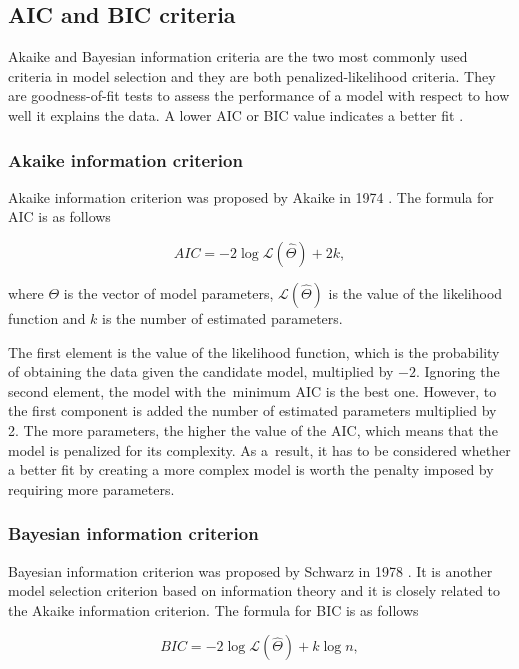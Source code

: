 \documentclass[english]{pwr_wmat_praca_dyplomowa}
\theoremstyle{plain}
\theoremstyle{definition}
\numberwithin{theorem}{chapter}
\begin{document}
\subsection{AIC and BIC criteria}

Akaike and Bayesian information criteria are the two most commonly used criteria in model
selection and they are both penalized-likelihood criteria. They are goodness-of-fit tests to assess the
performance of a model with respect to how well it explains the data. A lower AIC or BIC value indicates a better fit \cite{aic_bic}.

\subsubsection{Akaike information criterion}

Akaike information criterion was proposed by Akaike in 1974 \cite{aic}. The formula for AIC is as follows

\begin{equation}
	AIC = -2 \log{\mathcal{L}(\hat{\Theta})} + 2k,
\end{equation}

\noindent where $\Theta$ is the vector of model parameters, $\mathcal{L}(\hat{\Theta})$ is the value of the likelihood function and $k$ is the number of estimated parameters. 

The first element is the value of the likelihood function, which is the probability of obtaining the data given the candidate model, multiplied by $-2$. Ignoring the second element, the model with the~minimum AIC is the best one. However, to the first component is added the number of estimated parameters multiplied by 2. The more parameters, the higher the value of the AIC, which means that the model is penalized for its complexity. As a~result, it has to be considered whether a better fit by creating a more complex model is worth the penalty imposed by requiring more parameters.

\subsubsection{Bayesian information criterion}

Bayesian information criterion was proposed by Schwarz in 1978 \cite{bic}. It is another model selection criterion based on information theory and it is closely related to the Akaike information criterion. The formula for BIC is as follows

\begin{equation}
	BIC = -2 \log{\mathcal{L}(\hat{\Theta})} + k\log{n},
\end{equation}
\end{document}
